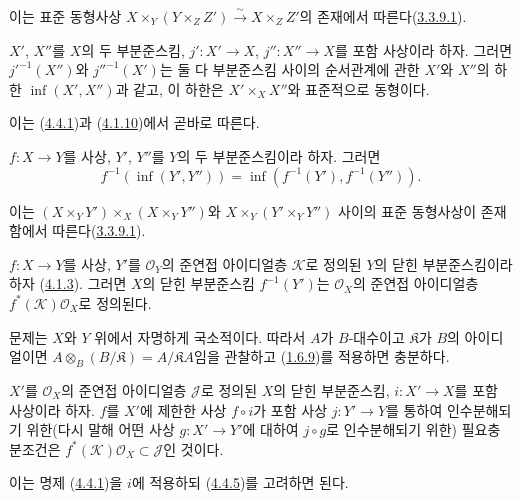 이는 표준 동형사상
$X\times_Y(Y\times_Z Z')\xrightarrow{\sim}X\times_Z Z'$의 존재에서
따른다(\hyperref[I.3.3.9.1-ko]{3.3.9.1}).

\begin{corollary}[4.4.3]
\label{I.4.4.3-ko}
$X'$, $X''$를 $X$의 두 부분준스킴,
$j':X'\to X$, $j'':X''\to X$를 포함 사상이라 하자. 그러면
${j'}^{-1}(X'')$와 ${j''}^{-1}(X')$는 둘 다 부분준스킴 사이의
순서관계에 관한 $X'$와 $X''$의 하한 $\inf(X',X'')$과 같고, 이
하한은 $X'\times_X X''$와 표준적으로 동형이다.
\end{corollary}

이는 (\hyperref[I.4.4.1-ko]{4.4.1})과
(\hyperref[I.4.1.10-ko]{4.1.10})에서 곧바로 따른다.

\begin{corollary}[4.4.4]
\label{I.4.4.4-ko}
$f:X\to Y$를 사상, $Y'$, $Y''$를 $Y$의 두 부분준스킴이라 하자.
그러면
\[
  f^{-1}(\inf(Y',Y''))=\inf(f^{-1}(Y'),f^{-1}(Y'')).
\]
\end{corollary}

이는 $(X\times_Y Y')\times_X(X\times_Y Y'')$와
$X\times_Y(Y'\times_Y Y'')$ 사이의 표준 동형사상이 존재함에서
따른다(\hyperref[I.3.3.9.1-ko]{3.3.9.1}).

\begin{proposition}[4.4.5]
\label{I.4.4.5-ko}
$f:X\to Y$를 사상, $Y'$를 $\mathscr{O}_Y$의 준연접 아이디얼층
$\mathscr{K}$로 정의된 $Y$의 닫힌 부분준스킴이라 하자
(\hyperref[I.4.1.3-ko]{4.1.3}). 그러면 $X$의 닫힌 부분준스킴
$f^{-1}(Y')$는 $\mathscr{O}_X$의 준연접 아이디얼층
$f^*(\mathscr{K})\mathscr{O}_X$로 정의된다.
\end{proposition}

{\raggedright
문제는 $X$와 $Y$ 위에서 자명하게 국소적이다. 따라서 $A$가
$B$-대수이고 $\mathfrak{K}$가 $B$의 아이디얼이면
$A\otimes_B(B/\mathfrak{K})=A/\mathfrak{K}A$임을 관찰하고
(\hyperref[I.1.6.9-ko]{1.6.9})를 적용하면 충분하다.\par}

\begin{corollary}[4.4.6]
\label{I.4.4.6-ko}
$X'$를 $\mathscr{O}_X$의 준연접 아이디얼층 $\mathscr{J}$로 정의된
$X$의 닫힌 부분준스킴, $i:X'\to X$를 포함 사상이라 하자. $f$를
$X'$에 제한한 사상 $f\circ i$가 포함 사상 $j:Y'\to Y$를 통하여
인수분해되기 위한(다시 말해 어떤 사상 $g:X'\to Y'$에 대하여
$j\circ g$로 인수분해되기 위한) 필요충분조건은
$f^*(\mathscr{K})\mathscr{O}_X\subset\mathscr{J}$인 것이다.
\end{corollary}

이는 명제 (\hyperref[I.4.4.1-ko]{4.4.1})을 $i$에 적용하되
(\hyperref[I.4.4.5-ko]{4.4.5})를 고려하면 된다.

